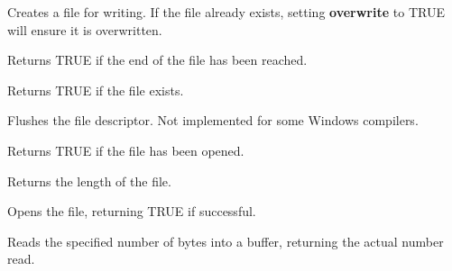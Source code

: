 Creates a file for writing. If the file already exists, setting {\bf overwrite} to TRUE
will ensure it is overwritten.

\label{wxfileeof}


Returns TRUE if the end of the file has been reached.

\label{wxfileexists}


Returns TRUE if the file exists.

\label{wxfileflush}


Flushes the file descriptor. Not implemented for some Windows compilers.

\label{wxfileisopened}


Returns TRUE if the file has been opened.

\label{wxfilelength}


Returns the length of the file.

\label{wxfileopen}


Opens the file, returning TRUE if successful.




\label{wxfileread}


Reads the specified number of bytes into a buffer, returning the actual number read.




